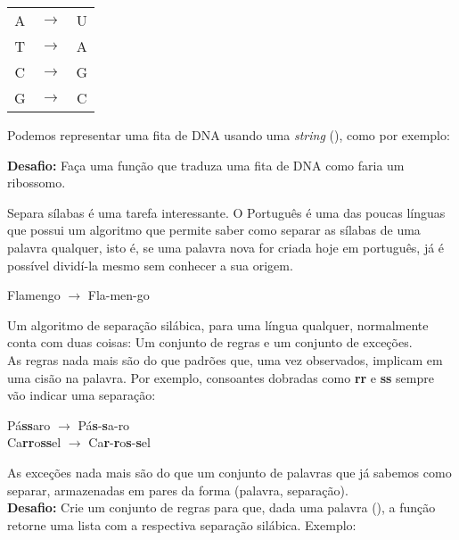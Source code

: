\documentclass[12pt]{article}
\begin{document}
	\begin{center}
			\begin{tabular}{ccc}
				A & $\rightarrow$ & U\\
				T & $\rightarrow$ & A\\
				C & $\rightarrow$ & G\\
				G & $\rightarrow$ & C\\
			\end{tabular}
	\end{center}
	
	Podemos representar uma fita de DNA usando uma \emph{string} (), como por exemplo:
	\begin{center}
	\end{center}
	\textbf{Desafio:} Faça uma função que traduza uma fita de DNA como faria um ribossomo.
	
	
	
	Separa sílabas é uma tarefa interessante. O Português é uma das poucas línguas que possui um algoritmo que permite saber como separar as sílabas de uma palavra qualquer, isto é, se uma palavra nova for criada hoje em português, já é possível dividí-la mesmo sem conhecer a sua origem.
	
	\begin{center}
		Flamengo $\to$ Fla-men-go
	\end{center}
	
	Um algoritmo de separação silábica, para uma língua qualquer, normalmente conta com duas coisas: Um conjunto de regras e um conjunto de exceções.\\
	
	As regras nada mais são do que padrões que, uma vez observados, implicam em uma cisão na palavra. Por exemplo, consoantes dobradas como \textbf{rr} e \textbf{ss} sempre vão indicar uma separação:
	
	\begin{center}
		Pá\textbf{ss}aro $\to$ Pá\textbf{s}-\textbf{s}a-ro\\
		Ca\textbf{rr}o\textbf{ss}el $\to$ Ca\textbf{r}-\textbf{r}o\textbf{s}-\textbf{s}el
	\end{center}
	
	As exceções nada mais são do que um conjunto de palavras que já sabemos como separar, armazenadas em pares da forma (palavra, separação).\\
	
	\textbf{Desafio:} Crie um conjunto de regras para que, dada uma palavra (), a função retorne uma lista com a respectiva separação silábica. Exemplo:
	
\end{document}
